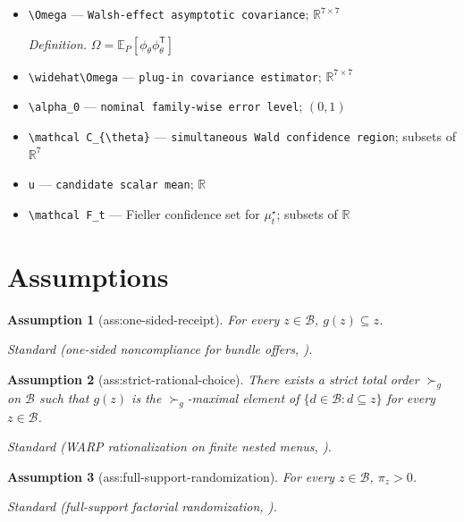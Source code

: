 \documentclass{article}
\newtheorem{assumption}{Assumption}
\begin{document}
\begin{itemize}
  \item \texttt{\textbackslash{}\allowbreak{}Omega} --- \texttt{Walsh-\allowbreak{}effect asymptotic covariance}; \(\mathbb R^{7\times7}\)
  \par\smallskip\noindent\emph{Definition.} \(\Omega=\mathbb E_P[\phi_{\theta}\phi_{\theta}^{\mathsf T}]\)
  \item \texttt{\textbackslash{}\allowbreak{}widehat\textbackslash{}\allowbreak{}Omega} --- \texttt{plug-\allowbreak{}in covariance estimator}; \(\mathbb R^{7\times7}\)
  \item \texttt{\textbackslash{}\allowbreak{}alpha\_\allowbreak{}0} --- \texttt{nominal family-\allowbreak{}wise error level}; \((0,1)\)
  \item \texttt{\textbackslash{}\allowbreak{}mathcal C\_\allowbreak{}\{\textbackslash{}\allowbreak{}theta\}\allowbreak{}} --- \texttt{simultaneous Wald confidence region}; subsets of \(\mathbb R^7\)
  \item \texttt{u} --- \texttt{candidate scalar mean}; \(\mathbb R\)
  \item \texttt{\textbackslash{}\allowbreak{}mathcal F\_\allowbreak{}t} --- Fieller confidence set for \(\mu_t^\star\); subsets of \(\mathbb R\)
\end{itemize}

\section{Assumptions}

\begin{assumption}[ass:one-sided-receipt]\label{ass:one-sided-receipt}
For every \(z\in\mathcal B\), \(g(z)\subseteq z\).
\par\smallskip\noindent\emph{Standard} (one-sided noncompliance for bundle offers, \cite{AngristImbensRubin1996}).
\end{assumption}

\begin{assumption}[ass:strict-rational-choice]\label{ass:strict-rational-choice}
There exists a strict total order \(\succ_g\) on \(\mathcal B\) such that \(g(z)\) is the \(\succ_g\)-maximal element of \(\{d\in\mathcal B:d\subseteq z\}\) for every \(z\in\mathcal B\).
\par\smallskip\noindent\emph{Standard} (WARP rationalization on finite nested menus, \cite{Goff2026OutcomeNonrestrictive}).
\end{assumption}

\begin{assumption}[ass:full-support-randomization]\label{ass:full-support-randomization}
For every \(z\in\mathcal B\), \(\pi_z>0\).
\par\smallskip\noindent\emph{Standard} (full-support factorial randomization, \cite{BlackwellPashley2023FactorialIV}).
\end{assumption}
\end{document}
